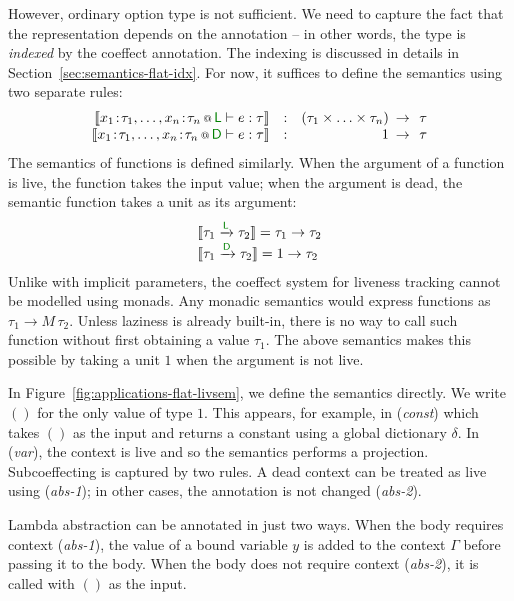 However, ordinary option type is not sufficient. We need to capture the fact that the
representation depends on the annotation -- in other words, the type is \emph{indexed} by
the coeffect annotation. The indexing is discussed in details in Section~\ref{sec:semantics-flat-idx}.
For now, it suffices to define the semantics using two separate rules:
%
\begin{equation*}
\begin{array}{rlrcl}
\sem{\coctx{x_1\!:\!\tau_1, \ldots, x_n\!:\!\tau_n}{ \cclrd{\cclrd{\ident{L}}} } \vdash e : \tau}
  &:& (\tau_1 \times \ldots \times \tau_n) &\narrow{\rightarrow}& \tau\\
\sem{\coctx{x_1\!:\!\tau_1, \ldots, x_n\!:\!\tau_n}{ \cclrd{\cclrd{\ident{D}}} } \vdash e : \tau}
  &:& 1 &\narrow{\rightarrow}& \tau
\end{array}
\end{equation*}
%
The semantics of functions is defined similarly. When the argument of a function is live, the function
takes the input value; when the argument is dead, the semantic function takes a unit as its argument:
%
\begin{equation*}
\begin{array}{l}
\sem{\tau_1 \xrightarrow{\cclrd{\cclrd{\ident{L}}}} \tau_2} = \tau_1 \rightarrow \tau_2\\
\sem{\tau_1 \xrightarrow{\cclrd{\cclrd{\ident{D}}}} \tau_2} = 1 \rightarrow \tau_2
\end{array}
\end{equation*}
%
Unlike with implicit parameters, the coeffect system for liveness tracking cannot be modelled
using monads. Any monadic semantics would express functions as $\tau_1 \rightarrow M\, \tau_2$.
Unless laziness is already built-in, there is no way to call such function without
first obtaining a value $\tau_1$. The above semantics makes this possible by taking a unit $1$ when
the argument is not live.

In Figure~\ref{fig:applications-flat-livsem}, we define the semantics directly. We write $()$ for
the only value of type $1$. This appears, for example, in (\emph{const}) which takes $()$ as the
input and returns a constant using a global dictionary $\delta$. In (\emph{var}), the context is live
and so the semantics performs a projection. Subcoeffecting is captured by two rules. A dead context
can be treated as live using (\emph{abs-1}); in other cases, the annotation is not changed (\emph{abs-2}).

Lambda abstraction can be annotated in just two ways. When the body requires context (\emph{abs-1}),
the value of a bound variable $y$ is added to the context $\Gamma$ before passing it to the body.
When the body does not require context (\emph{abs-2}), it is called with $()$ as the input.

